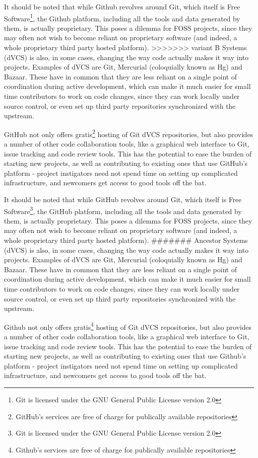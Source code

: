 \documentclass[a4paper,11pt]{article} %
\begin{document}
It should be noted that while Github revolves around Git, which itself is
Free Software\footnote{Git is licensed under the GNU General Public License
  version 2.0}, the Github platform, including all the tools and data
generated by them, is actually proprietary. This poses a dilemma for FOSS
projects, since they may often not wish to become reliant on proprietary
software (and indeed, a whole proprietary third party hosted platform).
>>>>>>> variant B
Systems (dVCS) is also, in some cases, changing the way code actually
makes it way into projects. Examples of dVCS are Git, Mercurial
(coloquially known as Hg) and Bazaar. These have in common that they
are less reliant on a single point of coordination during active
development, which can make it much easier for small time contributors
to work on code changes, since they can work locally under source
control, or even set up third party repositories synchronized with the
upstream.

GitHub not only offers gratis\footnote{GitHub's services are free of
  charge for publically available repositories} hosting of Git dVCS
repositories, but also provides a number of other code collaboration
tools, like a graphical web interface to Git, issue tracking and code
review tools. This has the potential to ease the burden of starting
new projects, as well as contributing to existing ones that use
GitHub's platform - project instigators need not spend time on setting
up complicated infrastructure, and newcomers get access to good tools
off the bat.

It should be noted that while GitHub revolves around Git, which itself
is Free Software\footnote{Git is licensed under the GNU General Public
  License version 2.0}, the GitHub platform, including all the tools
and data generated by them, is actually proprietary. This poses a
dilemma for FOSS projects, since they may often not wish to become
reliant on proprietary software (and indeed, a whole proprietary third
party hosted platform).
####### Ancestor
Systems (dVCS) is also, in some cases, changing the way code actually
makes it way into projects. Examples of dVCS are Git, Mercurial
(coloquially known as Hg) and Bazaar. These have in common that they
are less reliant on a single point of coordination during active
development, which can make it much easier for small time contributors
to work on code changes, since they can work locally under source
control, or even set up third party repositories synchronized with the
upstream.

Github not only offers gratis\footnote{Github's services are free of
  charge for publically available repositories} hosting of Git dVCS
repositories, but also provides a number of other code collaboration
tools, like a graphical web interface to Git, issue tracking and code
review tools. This has the potential to ease the burden of starting
new projects, as well as contributing to existing ones that use
Github's platform - project instigators need not spend time on setting
up complicated infrastructure, and newcomers get access to good tools
off the bat.
\end{document}
